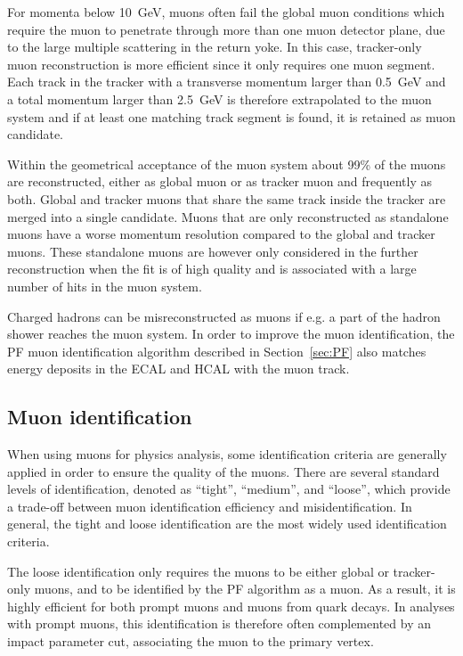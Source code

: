 For momenta below \SI{10}{GeV}, muons often fail the global muon conditions which require the muon to penetrate through more than one muon detector plane, due to the large multiple scattering in the return yoke. In this case, tracker-only muon reconstruction is more efficient since it only requires one muon segment. Each track in the tracker with a transverse momentum larger than \SI{0.5}{GeV} and a total momentum larger than \SI{2.5}{GeV} is therefore extrapolated to the muon system and if at least one matching track segment is found, it is retained as muon candidate.

Within the geometrical acceptance of the muon system about 99\% of the muons are reconstructed, either as global muon or as tracker muon and frequently as both. Global and tracker muons that share the same track inside the tracker are merged into a single candidate. Muons that are only reconstructed as standalone muons have a worse momentum resolution compared to the global and tracker muons. These standalone muons are however only considered in the further reconstruction when the fit is of high quality and is associated with a large number of hits in the muon system.

Charged hadrons can be misreconstructed as muons if e.g. a part of the hadron shower reaches the muon system. In order to improve the muon identification, the \ac{PF} muon identification algorithm described in Section~\ref{sec:PF} also matches energy deposits in the \ac{ECAL} and \ac{HCAL} with the muon track.

\subsection{Muon identification}
\label{sec:muonID}

When using muons for physics analysis, some identification criteria are generally applied in order to ensure the quality of the muons. There are several standard levels of identification, denoted as ``tight'', ``medium'', and ``loose'', which provide a trade-off between muon identification efficiency and misidentification. In general, the tight and loose identification are the most widely used identification criteria.

The loose identification only requires the muons to be either global or tracker-only muons, and to be identified by the \ac{PF} algorithm as a muon. As a result, it is highly efficient for both prompt muons and muons from quark decays. In analyses with prompt muons, this identification is therefore often complemented by an impact parameter cut, associating the muon to the primary vertex.

